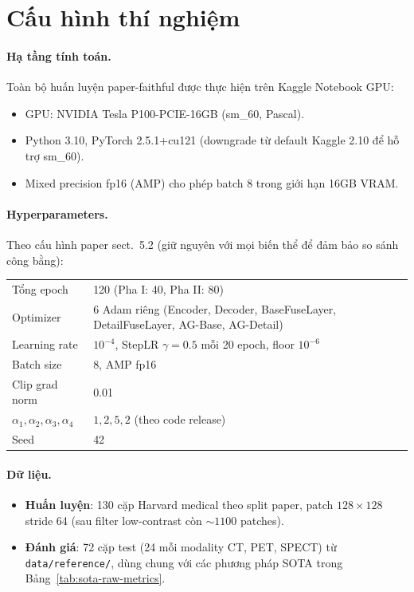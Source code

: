 \section{Cấu hình thí nghiệm}
\label{sec:setup}

\paragraph{Hạ tầng tính toán.}
Toàn bộ huấn luyện paper-faithful được thực hiện trên Kaggle Notebook GPU:
\begin{itemize}\itemsep0pt
    \item GPU: NVIDIA Tesla P100-PCIE-16GB (sm\_60, Pascal).
    \item Python 3.10, PyTorch 2.5.1+cu121 (downgrade từ default Kaggle 2.10 để hỗ trợ sm\_60).
    \item Mixed precision fp16 (AMP) cho phép batch 8 trong giới hạn 16GB VRAM.
\end{itemize}

\paragraph{Hyperparameters.}
Theo cấu hình paper sect.~5.2 (giữ nguyên với mọi biến thể để đảm bảo so sánh công bằng):
\begin{center}
\begin{tabular}{ll}
\toprule
Tổng epoch & 120 (Pha I: 40, Pha II: 80) \\
Optimizer  & 6 Adam riêng (Encoder, Decoder, BaseFuseLayer, DetailFuseLayer, AG-Base, AG-Detail) \\
Learning rate & $10^{-4}$, StepLR $\gamma = 0.5$ mỗi 20 epoch, floor $10^{-6}$ \\
Batch size & 8, AMP fp16 \\
Clip grad norm & 0.01 \\
$\alpha_1, \alpha_2, \alpha_3, \alpha_4$ & $1, 2, 5, 2$ (theo code release) \\
Seed & 42 \\
\bottomrule
\end{tabular}
\end{center}

\paragraph{Dữ liệu.}
\begin{itemize}\itemsep0pt
    \item \textbf{Huấn luyện}: 130 cặp Harvard medical theo split paper, patch $128 \times 128$ stride 64 (sau filter low-contrast còn $\sim 1100$ patches).
    \item \textbf{Đánh giá}: 72 cặp test (24 mỗi modality CT, PET, SPECT) từ \texttt{data/reference/}, dùng chung với các phương pháp SOTA trong Bảng~\ref{tab:sota-raw-metrics}.
\end{itemize}

